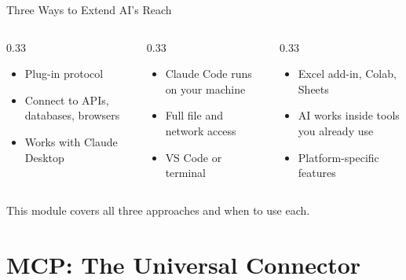 \documentclass[aspectratio=169]{beamer}
\begin{document}
\begin{frame}{Three Ways to Extend AI's Reach}
\begin{columns}[T]
\begin{column}{0.33\textwidth}
\begin{shadedbox}[title=\textbf{MCP Servers}]
\begin{itemize}\small
  \item Plug-in protocol
  \item Connect to APIs, databases, browsers
  \item Works with Claude Desktop
\end{itemize}
\end{shadedbox}
\end{column}
\begin{column}{0.33\textwidth}
\begin{shadedbox}[title=\textbf{Code Execution}]
\begin{itemize}\small
  \item Claude Code runs on your machine
  \item Full file and network access
  \item VS Code or terminal
\end{itemize}
\end{shadedbox}
\end{column}
\begin{column}{0.33\textwidth}
\begin{shadedbox}[title=\textbf{AI in Apps}]
\begin{itemize}\small
  \item Excel add-in, Colab, Sheets
  \item AI works inside tools you already use
  \item Platform-specific features
\end{itemize}
\end{shadedbox}
\end{column}
\end{columns}
\vspace{0.3cm}
This module covers all three approaches and when to use each.
\end{frame}

\section{MCP: The Universal Connector}
\end{document}
